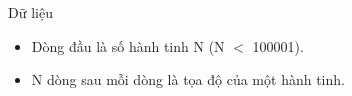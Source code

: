 Dữ liệu
\begin{itemize}
	\item     Dòng đầu là số hành tinh N (N $<$ 100001).   
	\item     N dòng sau mỗi dòng là tọa độ của một hành tinh.   
\end{itemize}